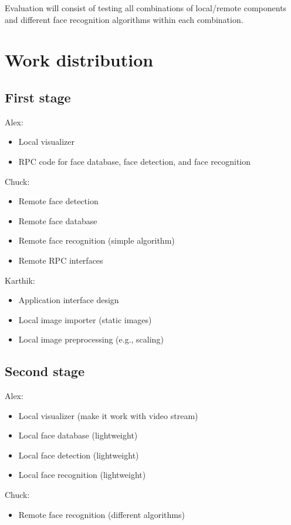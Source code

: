 \documentclass[conference]{IEEEtran}
\begin{document}
Evaluation will consist of testing all combinations of local/remote components and different face recognition algorithms within each combination.

\section{Work distribution}

\subsection{First stage}

Alex:
\begin{itemize}
	\item Local visualizer
	\item RPC code for face database, face detection, and face recognition
\end{itemize}

Chuck:
\begin{itemize}
	\item Remote face detection
	\item Remote face database
	\item Remote face recognition (simple algorithm)
	\item Remote RPC interfaces
\end{itemize}

Karthik:
\begin{itemize}
	\item Application interface design
	\item Local image importer (static images)
	\item Local image preprocessing (e.g., scaling)
\end{itemize}

\subsection{Second stage}

Alex:
\begin{itemize}
	\item Local visualizer (make it work with video stream)
	\item Local face database (lightweight)
	\item Local face detection (lightweight)
	\item Local face recognition (lightweight)
\end{itemize}

Chuck:
\begin{itemize}
	\item Remote face recognition (different algorithms)
\end{itemize}
\end{document}
